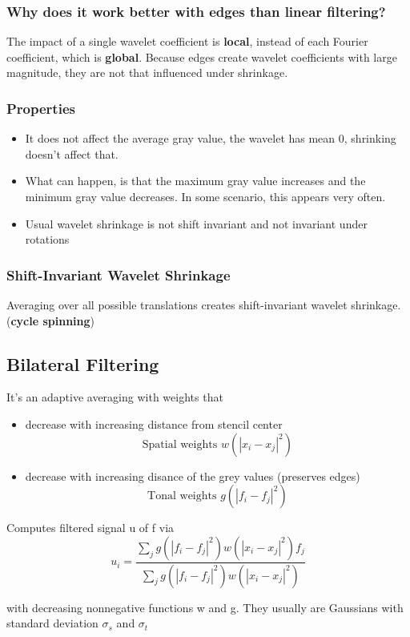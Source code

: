 \documentclass{article}
\begin{document}
\subsubsection{Why does it work better with edges than linear filtering?}
The impact of a single wavelet coefficient is \textbf{local}, instead of each Fourier coefficient, which is \textbf{global}. Because edges create wavelet coefficients with large magnitude, they are not that influenced under shrinkage.

\subsubsection{Properties}
\begin{itemize}
  \item It does not affect the average gray value, the wavelet has mean 0, shrinking doesn't affect that.
  \item What can happen, is that the maximum gray value increases and the minimum gray value decreases. In some scenario, this appears very often.
  \item Usual wavelet shrinkage is not shift invariant and not invariant under rotations
\end{itemize}
\subsubsection{Shift-Invariant Wavelet Shrinkage}
Averaging over all possible translations creates shift-invariant wavelet shrinkage. (\textbf{cycle spinning})


\subsection{Bilateral Filtering}
It's an adaptive averaging with weights that
\begin{itemize}
  \item decrease with increasing distance from stencil center
  \[\text{Spatial weights } w(|x_i-x_j|^2)\]
  \item decrease with increasing disance of the grey values (preserves edges)
  \[\text{Tonal weights }g(|f_i-f_j|^2)\]
\end{itemize}

Computes filtered signal u of f via
\[u_i = \frac{\sum_j g(|f_i-f_j|^2) w(|x_i-x_j|^2)f_j}{\sum_j g(|f_i-f_j|^2)w(|x_i-x_j|^2)}\]

with decreasing nonnegative functions w and g. They usually are Gaussians with standard deviation $\sigma_s$ and $\sigma_t$
\end{document}
